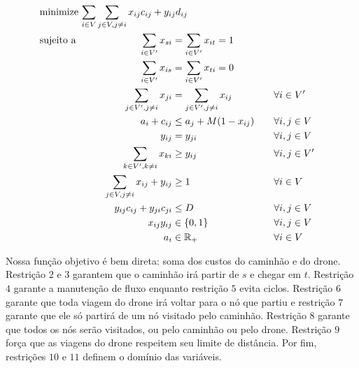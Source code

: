 \documentclass[11pt]{article}
\begin{document}
\begin{alignat}{4}
& \omit\rlap{minimize  $\displaystyle \sum_{i \in V} \sum_{j \in V ,j \neq i} x_{ij} c_{ij} + y_{ij} d_{ij} $} \\
& \mbox{sujeito a}&& \quad & \sum_{i \in V'} x_{si} &= \sum_{i \in V'} x_{it} = 1                 & \quad &  \\
&                 &&       &  \sum_{i \in V'} x_{is} &= \sum_{i \in V'} x_{ti} = 0                 & \quad &  \\
&                 &&       & \sum_{j \in V', j \neq i} x_{ji} &= \sum_{j \in V', j \neq i} x_{ij}     &       & \forall i \in V'   \\
&                 &&       & a_i + c_{ij} &\leq a_j + M(1 - x_{ij})                             &       & \forall i,j \in V \\
&                 &&       & y_{ij} &= y_{ji}                                                   &       & \forall i,j \in V   \\
&                 &&       & \sum_{k \in V', k \neq i} x_{ki} &\geq y_{ij}                                &       & \forall i,j \in V' \\
&                 &&       & \sum_{j \in V, j \neq i} x_{ij} + y_{ij} &\geq 1                        &       & \forall i \in V   \\
&                 &&       & y_{ij} c_{ij} + y_{ji} c_{ji} &\leq D                               &       & \forall i,j \in V  \\
&                 &&       & x_{ij} y_{ij} &\in \{0,1\}                                         &       & \forall i,j \in V \\
&                 &&       & a_i &\in \mathbb{R}_+                                             &         & \forall i \in V
\end{alignat}

Nossa função objetivo é bem direta: soma dos custos do caminhão e do drone. Restrição \(2\) e \(3\) garantem que o caminhão irá partir de \(s\) e chegar em \(t\). Restrição \(4\) garante a manutenção de fluxo enquanto restrição \(5\) evita ciclos. Restrição \(6\) garante que toda viagem do drone irá voltar para o nó que partiu e restrição \(7\) garante que ele só partirá de um nó visitado pelo caminhão. Restrição \(8\) garante que todos os nós serão visitados, ou pelo caminhão ou pelo drone. Restrição \(9\) força que as viagens do drone respeitem seu limite de distância. Por fim, restrições \(10\) e \(11\) definem o domínio das variáveis.
\end{document}
